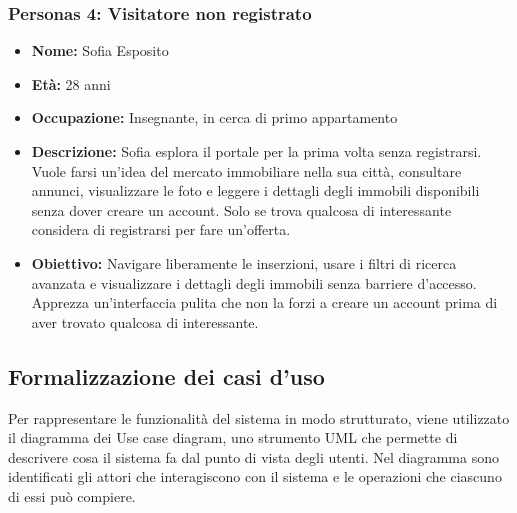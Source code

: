 \documentclass[a4paper,11pt]{article}
\begin{document}
\vspace{1em}
\subsubsection{Personas 4: Visitatore non registrato}
\noindent
\begin{minipage}[c]{0.55\textwidth}
    \begin{itemize}
        \item \textbf{Nome:} Sofia Esposito
        \item \textbf{Età:} 28 anni
        \item \textbf{Occupazione:} Insegnante, in cerca di primo appartamento
    \end{itemize}
\end{minipage}

\begin{itemize}
    \item \textbf{Descrizione:} Sofia esplora il portale per la prima volta senza registrarsi. Vuole farsi un'idea del mercato immobiliare nella sua città, consultare annunci, visualizzare le foto e leggere i dettagli degli immobili disponibili senza dover creare un account. Solo se trova qualcosa di interessante considera di registrarsi per fare un'offerta.

    \item \textbf{Obiettivo:} Navigare liberamente le inserzioni, usare i filtri di ricerca avanzata e visualizzare i dettagli degli immobili senza barriere d'accesso. Apprezza un'interfaccia pulita che non la forzi a creare un account prima di aver trovato qualcosa di interessante.
\end{itemize}

\newpage
\subsection{Formalizzazione dei casi d'uso}
Per rappresentare le funzionalità del sistema in modo strutturato, viene utilizzato 
il diagramma dei Use case diagram, uno strumento UML che permette 
di descrivere cosa il sistema fa dal punto di vista degli utenti. Nel diagramma 
sono identificati gli attori che interagiscono con il sistema e le operazioni 
che ciascuno di essi può compiere.
\end{document}

